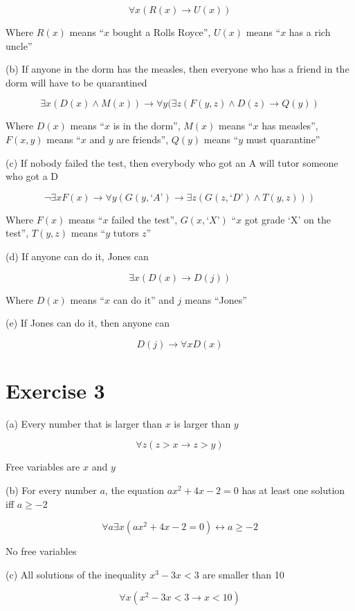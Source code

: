 \documentclass[11pt]{article}
\newcommand{\then}{\rightarrow}
\newcommand{\bicond}{\leftrightarrow}
\begin{document}
$$\forall x (R(x) \then U(x))$$

Where 
$R(x)$ means ``$x$ bought a Rolls Royce'',
$U(x)$ means ``$x$ has a rich uncle''

\noindent (b) If anyone in the dorm has the measles, then everyone who has a 
friend in the dorm will have to be quarantined 

$$\exists x (D(x) \wedge M(x)) \then \forall y (\exists z (F(y, z) \wedge D(z) \then Q(y))$$

Where
$D(x)$ means ``$x$ is in the dorm'',
$M(x)$ means ``$x$ has measles'',
$F(x, y)$ means ``$x$ and $y$ are friends'',
$Q(y)$ means ``$y$ must quarantine''

\noindent (c) If nobody failed the test, then everybody who got an A will tutor someone who got a D

$$\neg \exists x F(x) \then \forall y (G(y, \text{`}A\text{'}) \then \exists z (G(z, \text{`}D\text{'}) \wedge T(y, z)))$$

Where
$F(x)$ means ``$x$ failed the test'',
$G(x, \text{`}X\text{'})$ ``$x$ got grade `X' on the test'',
$T(y, z)$ means ``$y$ tutors $z$''

\noindent (d) If anyone can do it, Jones can

$$\exists x (D(x) \then D(j))$$

Where $D(x)$ means ``$x$ can do it'' and $j$ means ``Jones''

\noindent (e) If Jones can do it, then anyone can

$$D(j) \then \forall x D(x)$$

\section*{Exercise 3}

\noindent (a) Every number that is larger than $x$ is larger than $y$

$$\forall z (z > x \then z > y)$$

Free variables are $x$ and $y$

\noindent (b) For every number $a$, the equation $ax^2 + 4x - 2 = 0$ has at 
least one solution iff $a \geq -2$

$$\forall a \exists x (ax^2 + 4x - 2 = 0) \bicond a \geq -2$$

No free variables

\noindent (c) All solutions of the inequality $x^3 - 3x < 3$ are smaller than 10

$$\forall x (x^2 - 3x < 3 \then x < 10)$$
\end{document}
